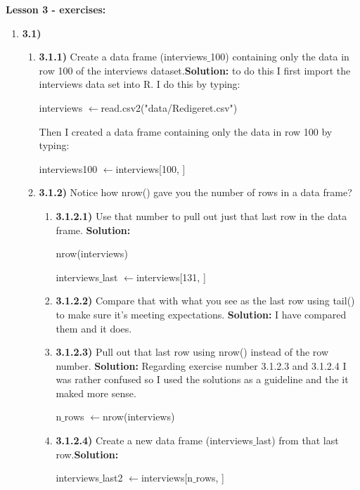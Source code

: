 \documentclass{article}
\begin{document}
\textbf{Lesson 3 - exercises:} \newline
\begin{enumerate}
    \item \textbf{3.1)}
    \begin{enumerate}
        \item \textbf{3.1.1)} Create a data frame (interviews$\_$100) containing only the data in row 100 of the interviews dataset.\textbf{Solution:} to do this I first import the interviews data set into R. I do this by typing: 
\begin{center}
    interviews $\leftarrow$read.csv2("data/Redigeret.csv")
\end{center}
Then I created a data frame containing only the data in row 100 by typing:
\begin{center}
  interviews100 $\leftarrow$interviews[100, ]  
\end{center}
    \item \textbf{3.1.2)} Notice how nrow() gave you the number of rows in a data frame? 
    \begin{enumerate}
        \item \textbf{3.1.2.1)} Use that number to pull out just that last row in the data frame. \textbf{Solution:}
\begin{center}
    nrow(interviews)
\end{center}
\begin{center}
interviews$\_$last $\leftarrow$interviews[131, ]   
\end{center}
    \item \textbf{3.1.2.2)} Compare that with what you see as the last row using tail() to make sure it’s meeting expectations. \textbf{Solution:} I have compared them and it does.
    \item \textbf{3.1.2.3)} Pull out that last row using nrow() instead of the row number. \textbf{Solution:} Regarding exercise number 3.1.2.3 and 3.1.2.4 I was rather confused so I used the solutions as a guideline and the it maked more sense.
\begin{center}
n$\_$rows $\leftarrow$nrow(interviews)
\end{center}
    \item \textbf{3.1.2.4)} Create a new data frame (interviews$\_$last) from that last row.\textbf{Solution:}
\begin{center}
  interviews$\_$last2 $\leftarrow$interviews[n$\_$rows, ]  
\end{center}
    \end{enumerate}

\end{enumerate}
\end{enumerate}
\end{document}
